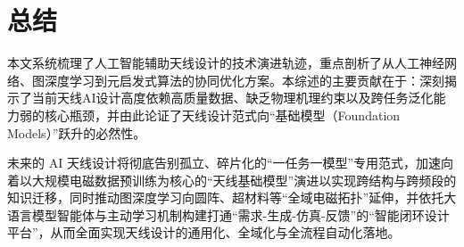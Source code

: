 \documentclass[UTF8,a4paper,12pt]{ctexart}
\begin{document}
\section{总结}
本文系统梳理了人工智能辅助天线设计的技术演进轨迹，重点剖析了从人工神经网络、图深度学习到元启发式算法的协同优化方案。本综述的主要贡献在于：深刻揭示了当前天线AI设计高度依赖高质量数据、缺乏物理机理约束以及跨任务泛化能力弱的核心瓶颈，并由此论证了天线设计范式向“基础模型（Foundation Models）”跃升的必然性。

未来的 AI 天线设计将彻底告别孤立、碎片化的“一任务一模型”专用范式，加速向着以大规模电磁数据预训练为核心的“天线基础模型”演进以实现跨结构与跨频段的知识迁移，同时推动图深度学习向圆阵、超材料等“全域电磁拓扑”延伸，并依托大语言模型智能体与主动学习机制构建打通“需求-生成-仿真-反馈”的“智能闭环设计平台”，从而全面实现天线设计的通用化、全域化与全流程自动化落地。

\newpage
\end{document}
